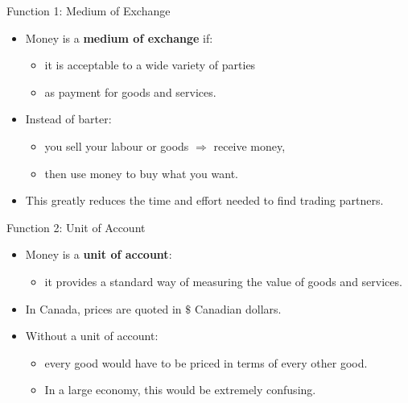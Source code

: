 \documentclass[aspectratio=169]{beamer}
\begin{document}
\begin{frame}{Function 1: Medium of Exchange}
\transfade
\begin{itemize}[<+->]
  \item Money is a \textbf{medium of exchange} if:
  \begin{itemize}[<+->]
    \item it is acceptable to a wide variety of parties
    \item as payment for goods and services.
  \end{itemize}
  \item Instead of barter:
  \begin{itemize}[<+->]
    \item you sell your labour or goods \(\Rightarrow\) receive money,
    \item then use money to buy what you want.
  \end{itemize}
  \item This greatly reduces the time and effort needed to find trading partners.
\end{itemize}
\end{frame}

\begin{frame}{Function 2: Unit of Account}
\transfade
\begin{itemize}[<+->]
  \item Money is a \textbf{unit of account}:
  \begin{itemize}[<+->]
    \item it provides a standard way of measuring the value of goods and services.
  \end{itemize}
  \item In Canada, prices are quoted in \(\$\) \alert{Canadian dollars}.
  \item Without a unit of account:
  \begin{itemize}[<+->]
    \item every good would have to be priced in terms of every other good.
    \item In a large economy, this would be extremely confusing.
  \end{itemize}
\end{itemize}
\end{frame}
\end{document}
